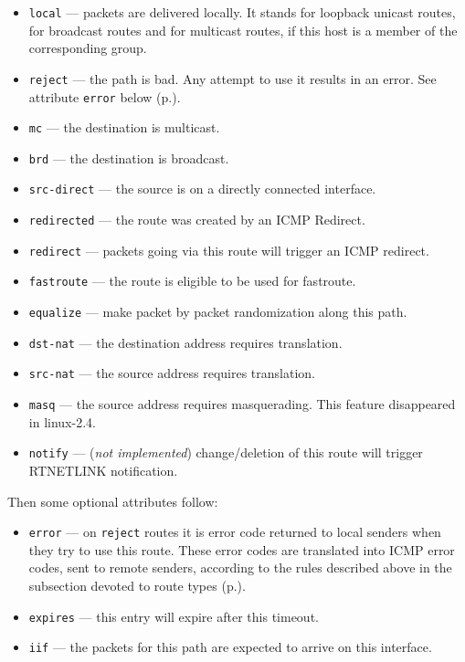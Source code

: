 \begin{itemize}
\item \verb|local| --- packets are delivered locally.
It stands for loopback unicast routes, for broadcast routes
and for multicast routes, if this host is a member of the corresponding
group.

\item \verb|reject| --- the path is bad. Any attempt to use it results
in an error. See attribute \verb|error| below (p.\pageref{IP-ROUTE-GET-error}).

\item \verb|mc| --- the destination is multicast.

\item \verb|brd| --- the destination is broadcast.

\item \verb|src-direct| --- the source is on a directly connected
interface.

\item \verb|redirected| --- the route was created by an ICMP Redirect.

\item \verb|redirect| --- packets going via this route will 
trigger an ICMP redirect.

\item \verb|fastroute| --- the route is eligible to be used for fastroute.

\item \verb|equalize| --- make packet by packet randomization
along this path.

\item \verb|dst-nat| --- the destination address requires translation.

\item \verb|src-nat| --- the source address requires translation.

\item \verb|masq| --- the source address requires masquerading.
This feature disappeared in linux-2.4.

\item \verb|notify| --- ({\em not implemented}) change/deletion
of this route will trigger RTNETLINK notification.
\end{itemize}

Then some optional attributes follow:
\begin{itemize}
\item \verb|error| --- on \verb|reject| routes it is error code
returned to local senders when they try to use this route.
These error codes are translated into ICMP error codes, sent to remote
senders, according to the rules described above in the subsection
devoted to route types (p.\pageref{IP-ROUTE-TYPES}).
\label{IP-ROUTE-GET-error}

\item \verb|expires| --- this entry will expire after this timeout.

\item \verb|iif| --- the packets for this path are expected to arrive
on this interface.
\end{itemize}

